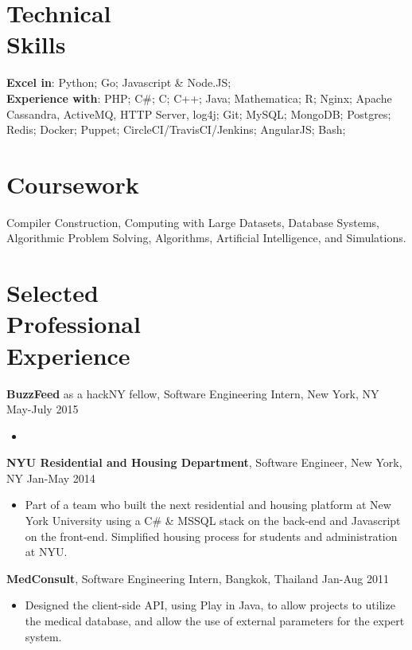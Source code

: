 \documentclass[margin]{res}
\begin{document}
 
\begin{resume}
 
\section{Technical \\ Skills}
{\bf Excel in}: Python; Go; Javascript \& Node.JS; \\
{\bf Experience with}: PHP;  C\#; C; C++; Java; Mathematica; R; Nginx; Apache Cassandra, ActiveMQ, HTTP Server, log4j; Git; MySQL; MongoDB; Postgres; Redis; Docker; Puppet; CircleCI/TravisCI/Jenkins; AngularJS; Bash;

\section{Coursework}
Compiler Construction, Computing with Large Datasets, Database Systems, Algorithmic Problem Solving, Algorithms,  Artificial Intelligence, and Simulations.
 
\section{Selected \\ Professional \\ Experience}

{\bf BuzzFeed} as a hackNY fellow, Software Engineering Intern, New York, NY \hfill May-July 2015
 \begin{itemize} \itemsep -2pt
 \item 
 \end{itemize}

{\bf NYU Residential and Housing Department}, Software Engineer, New York, NY \hfill Jan-May 2014
\begin{itemize} \itemsep -2pt
\item Part of a team who built the next residential and housing platform at New York University using a C\# \& MSSQL stack on the back-end and Javascript on the front-end. Simplified housing process for students and administration at NYU.
\end{itemize}

{\bf MedConsult}, Software Engineering Intern, Bangkok, Thailand \hfill Jan-Aug 2011
\begin{itemize} \itemsep -2pt
\item Designed the client-side API, using Play in Java, to allow projects to utilize the medical database, and allow the use of external parameters for the expert system.
\end{itemize}
 

\end{resume}
\end{document}
